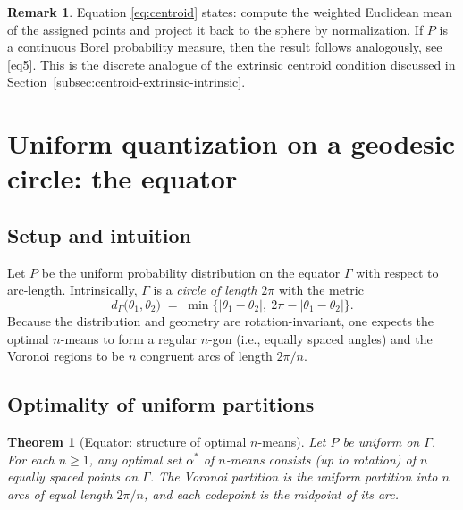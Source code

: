 \documentclass[12pt, reqno]{amsart}
\theoremstyle{plain}
\newtheorem{theorem1}[subsubsection]{Theorem}
\theoremstyle{definition}
\newtheorem{remark}[subsection]{Remark}
\newcommand{\gq}{\theta}
\begin{document}
\begin{remark}
Equation \eqref{eq:centroid} states: compute the weighted Euclidean mean of the assigned points
and project it back to the sphere by normalization. If $P$ is a continuous Borel probability measure, then the result follows analogously, see \eqref{eq5}. This is the discrete analogue of the extrinsic centroid condition discussed in Section~\ref{subsec:centroid-extrinsic-intrinsic}.
\end{remark}

\section{Uniform quantization on a geodesic circle: the equator}

\subsection{Setup and intuition}
Let $P$ be the uniform probability distribution on the equator $\Gamma$ with respect to arc-length. Intrinsically, $\Gamma$ is a \emph{circle of length $2\pi$} with the metric
\[
d_\Gamma\big(\gq_1,\gq_2\big)\;=\;\min\{|\gq_1-\gq_2|,\ 2\pi-|\gq_1-\gq_2|\}.
\]
Because the distribution and geometry are rotation-invariant, one expects the optimal $n$-means to form a regular $n$-gon (i.e., equally spaced angles) and the Voronoi regions to be $n$ congruent arcs of length $2\pi/n$.

\subsection{Optimality of uniform partitions}
\begin{theorem1}[Equator: structure of optimal $n$-means]\label{thm:equator-structure}
Let $P$ be uniform on $\Gamma$. For each $n\ge 1$, any optimal set $\alpha^\ast$ of $n$-means consists (up to rotation) of $n$ equally spaced points on $\Gamma$. The Voronoi partition is the uniform partition into $n$ arcs of equal length $2\pi/n$, and each codepoint is the midpoint of its arc.
\end{theorem1}
\end{document}
